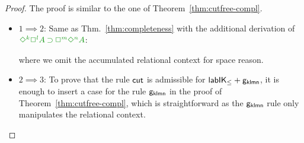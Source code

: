 \documentclass[a4paper]{article}
\begin{document}
\begin{proof} 
	The proof is similar to the one of Theorem~\ref{thm:cutfree-compl}.
	\begin{itemize}
		\item $1 \implies 2$:
		Same as Thm.~\ref{thm:completeness} with the additional derivation of $\fm{\DIA^k\BOX^l A \IMP \BOX^m\DIA^n A}$:
		\begin{smallequation*}
		\end{smallequation*}
		where we omit the accumulated relational context for space reason.
		
		\item $2 \implies 3$:
		To prove that the rule $\mathsf{cut}$ is admissible for $\mathsf{lab}\mathsf{IK}_{\le} + {\mathsf{g_{klmn}}}$, it is enough to insert a case for the rule ${\mathsf{g_{klmn}}}$ in the proof of Theorem~\ref{thm:cutfree-compl}, which
		is straightforward as the ${\mathsf{g_{klmn}}}$ rule only manipulates the relational context.
		

\end{itemize}
\end{proof}
\end{document}
